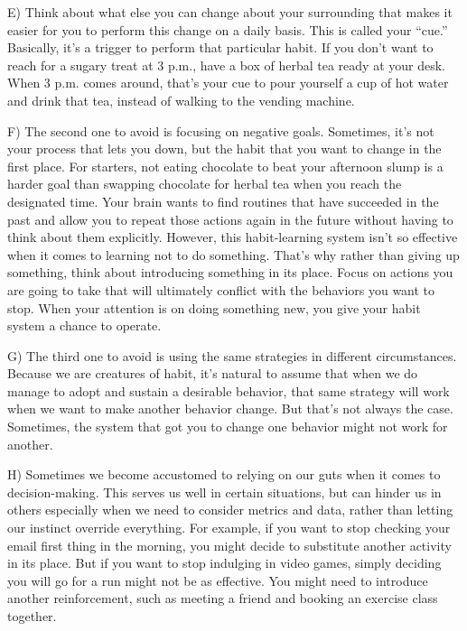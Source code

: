 \documentclass[UTF8,11pt]{ctexart}
\begin{document}
E) Think about what else you can change about your surrounding that makes it easier for you to perform this change on a daily basis. This is called your “cue.” Basically, it’s a trigger to perform that particular habit. If you don’t want to reach for a sugary treat at 3 p.m., have a box of herbal tea ready at your desk. When 3 p.m. comes around, that’s your cue to pour yourself a cup of hot water and drink that tea, instead of walking to the vending machine.


F) The second one to avoid is focusing on negative goals. Sometimes, it’s not your process that lets you down, but the habit that you want to change in the first place. For starters, not eating chocolate to beat your afternoon slump is a harder goal than swapping chocolate for herbal tea when you reach the designated time. Your brain wants to find routines that have succeeded in the past and allow you to repeat those actions again in the future without having to think about them explicitly. However, this habit-learning system isn’t so effective when it comes to learning not to do something. That’s why rather than giving up something, think about introducing something in its place. Focus on actions you are going to take that will ultimately conflict with the behaviors you want to stop. When your attention is on doing something new, you give your habit system a chance to operate.


G) The third one to avoid is using the same strategies in different circumstances. Because we are creatures of habit, it’s natural to assume that when we do manage to adopt and sustain a desirable behavior, that same strategy will work when we want to make another behavior change. But that’s not always the case. Sometimes, the system that got you to change one behavior might not work for another.


H) Sometimes we become accustomed to relying on our guts when it comes to decision-making. This serves us well in certain situations, but can hinder us in others especially when we need to consider metrics and data, rather than letting our instinct override everything. For example, if you want to stop checking your email first thing in the morning, you might decide to substitute another activity in its place. But if you want to stop indulging in video games, simply deciding you will go for a run might not be as effective. You might need to introduce another reinforcement, such as meeting a friend and booking an exercise class together.
\end{document}
